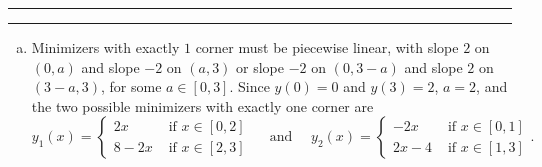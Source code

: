 \documentclass[11pt]{article}
\newcounter{questionCounter}
\newcounter{partCounter}[questionCounter]
\newenvironment{question}[2][\arabic{questionCounter}]{%
    \setcounter{partCounter}{0}%
    \vspace{.25in} \hrule \vspace{0.5em}%
        \noindent{\bf #2}%
    \vspace{0.8em} \hrule \vspace{.10in}%
    \addtocounter{questionCounter}{1}%
}{}
\begin{document}
\begin{question}{Problem 4}
\begin{enumerate}[(a)]
\item Minimizers with exactly $1$ corner must be piecewise linear, with slope
$2$ on $(0,a)$ and slope $-2$ on $(a,3)$ or slope $-2$ on $(0,3-a)$ and slope
$2$ on $(3-a,3)$, for some $a \in [0,3]$. Since $y(0) = 0$ and $y(3) = 2$,
$a = 2$, and the two possible minimizers with exactly one corner are
\[y_1(x) =
    \left\{
        \begin{array}{ll}
            2x & \mbox{ if } x \in [0,2] \\
            8 - 2x & \mbox{ if } x \in [2,3]
        \end{array}
    \right.
    \quad \mbox{ and } \quad
y_2(x) =
    \left\{
        \begin{array}{ll}
            -2x & \mbox{ if } x \in [0,1] \\
            2x - 4 & \mbox{ if } x \in [1,3]
        \end{array}
    \right..    
\]
\end{enumerate}
\end{question}
\end{document}

